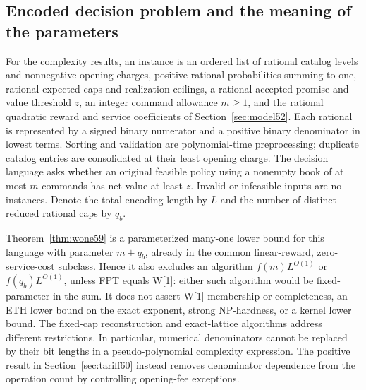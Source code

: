 \subsection{Encoded decision problem and the meaning of the parameters}\label{sec:decision60}
For the complexity results, an instance is an ordered list of rational catalog levels and nonnegative opening charges, positive rational probabilities summing to one, rational expected caps and realization ceilings, a rational accepted promise and value threshold $z$, an integer command allowance $m\geq1$, and the rational quadratic reward and service coefficients of Section~\ref{sec:model52}. Each rational is represented by a signed binary numerator and a positive binary denominator in lowest terms. Sorting and validation are polynomial-time preprocessing; duplicate catalog entries are consolidated at their least opening charge. The decision language asks whether an original feasible policy using a nonempty book of at most $m$ commands has net value at least $z$. Invalid or infeasible inputs are no-instances. Denote the total encoding length by $L$ and the number of distinct reduced rational caps by $q_b$.

Theorem~\ref{thm:wone59} is a parameterized many-one lower bound for this language with parameter $m+q_b$, already in the common linear-reward, zero-service-cost subclass. Hence it also excludes an algorithm $f(m)L^{O(1)}$ or $f(q_b)L^{O(1)}$, unless FPT equals W[1]: either such algorithm would be fixed-parameter in the sum. It does not assert W[1] membership or completeness, an ETH lower bound on the exact exponent, strong NP-hardness, or a kernel lower bound. The fixed-cap reconstruction and exact-lattice algorithms address different restrictions. In particular, numerical denominators cannot be replaced by their bit lengths in a pseudo-polynomial complexity expression. The positive result in Section~\ref{sec:tariff60} instead removes denominator dependence from the operation count by controlling opening-fee exceptions.
